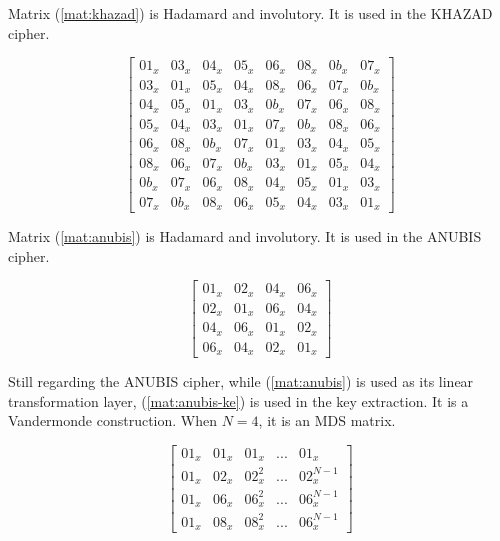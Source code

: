 \documentclass{report}
\begin{document}
\begin{footnotesize}
Matrix (\ref{mat:khazad}) is Hadamard and involutory. It is used in the KHAZAD \cite{KHAZAD2000} cipher.

\begin{equation}\label{mat:khazad}
\begin{bmatrix}
01_x & 03_x & 04_x & 05_x & 06_x & 08_x & 0b_x & 07_x\\
03_x & 01_x & 05_x & 04_x & 08_x & 06_x & 07_x & 0b_x\\
04_x & 05_x & 01_x & 03_x & 0b_x & 07_x & 06_x & 08_x\\
05_x & 04_x & 03_x & 01_x & 07_x & 0b_x & 08_x & 06_x\\
06_x & 08_x & 0b_x & 07_x & 01_x & 03_x & 04_x & 05_x\\
08_x & 06_x & 07_x & 0b_x & 03_x & 01_x & 05_x & 04_x\\
0b_x & 07_x & 06_x & 08_x & 04_x & 05_x & 01_x & 03_x\\
07_x & 0b_x & 08_x & 06_x & 05_x & 04_x & 03_x & 01_x
\end{bmatrix}
\end{equation}

Matrix (\ref{mat:anubis}) is Hadamard and involutory. It is used in the ANUBIS \cite{ANUBIS2000} cipher.

\begin{equation}\label{mat:anubis}
\begin{bmatrix}
01_x & 02_x & 04_x & 06_x\\
02_x & 01_x & 06_x & 04_x\\
04_x & 06_x & 01_x & 02_x\\
06_x & 04_x & 02_x & 01_x
\end{bmatrix}
\end{equation}

Still regarding the ANUBIS cipher, while (\ref{mat:anubis}) is used as its linear transformation layer, (\ref{mat:anubis-ke}) is used in the key extraction. It is a Vandermonde construction. When $N = 4$, it is an MDS matrix.

\begin{equation}\label{mat:anubis-ke}
\begin{bmatrix}
01_x & 01_x & 01_x & ... & 01_x\\
01_x & 02_x & 02_x^2 & ... & 02_x^{N-1}\\
01_x & 06_x & 06_x^2 & ... & 06_x^{N-1}\\
01_x & 08_x & 08_x^2 & ... & 06_x^{N-1}
\end{bmatrix}
\end{equation}


\end{footnotesize}
\end{document}
